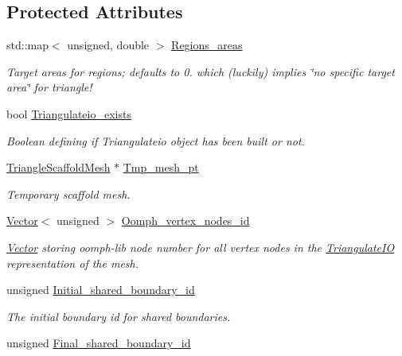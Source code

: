 \subsection*{Protected Attributes}
\begin{DoxyCompactItemize}
\item 
std\+::map$<$ unsigned, double $>$ \hyperlink{classoomph_1_1TriangleMesh_a26e357b1993ee77e390aa3b246c1e12b}{Regions\+\_\+areas}
\begin{DoxyCompactList}\small\item\em Target areas for regions; defaults to 0. which (luckily) implies \char`\"{}no specific target area\char`\"{} for triangle! \end{DoxyCompactList}\item 
bool \hyperlink{classoomph_1_1TriangleMesh_a6675edf7227a8ae62d7c13c8b406842b}{Triangulateio\+\_\+exists}
\begin{DoxyCompactList}\small\item\em Boolean defining if Triangulateio object has been built or not. \end{DoxyCompactList}\item 
\hyperlink{classoomph_1_1TriangleScaffoldMesh}{Triangle\+Scaffold\+Mesh} $\ast$ \hyperlink{classoomph_1_1TriangleMesh_a0c0fd18f3ec5d004370ba590d6c952d4}{Tmp\+\_\+mesh\+\_\+pt}
\begin{DoxyCompactList}\small\item\em Temporary scaffold mesh. \end{DoxyCompactList}\item 
\hyperlink{classoomph_1_1Vector}{Vector}$<$ unsigned $>$ \hyperlink{classoomph_1_1TriangleMesh_a9fc2a4cae497a1b626293831b9824ca5}{Oomph\+\_\+vertex\+\_\+nodes\+\_\+id}
\begin{DoxyCompactList}\small\item\em \hyperlink{classoomph_1_1Vector}{Vector} storing oomph-\/lib node number for all vertex nodes in the \hyperlink{structoomph_1_1TriangulateIO}{Triangulate\+IO} representation of the mesh. \end{DoxyCompactList}\item 
unsigned \hyperlink{classoomph_1_1TriangleMesh_a2a450374603e117c534221c13e2cae86}{Initial\+\_\+shared\+\_\+boundary\+\_\+id}
\begin{DoxyCompactList}\small\item\em The initial boundary id for shared boundaries. \end{DoxyCompactList}\item 
unsigned \hyperlink{classoomph_1_1TriangleMesh_abb552c8115f5e4aea9138379a0523493}{Final\+\_\+shared\+\_\+boundary\+\_\+id}

\end{DoxyCompactItemize}
